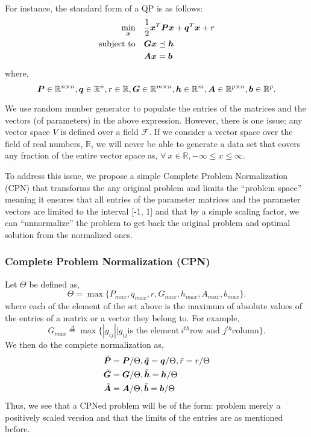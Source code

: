 \documentclass{article} %
\begin{document}
    For instance, the standard form of a QP is as follows:
    \begin{subequations}
    \begin{align}
        \min_{{\bm{x}}} \quad &\frac{1}{2}{\bm{x}}^T {\bm{P}} {\bm{x}} + {\bm{q}}^T {\bm{x}} + r \\
        \text{subject to} \quad &{\bm{G}} {\bm{x}} \preceq {\bm{h}} \\
        \quad &{\bm{A}} {\bm{x}} = {\bm{b}}  
    \end{align}
    \end{subequations}
    where, \[{\bm{P}} \in \mathbb{R}^{n \times n}, {\bm{q}} \in \mathbb{R}^{n}, r \in \mathbb{R}, {\bm{G}} \in \mathbb{R}^{m \times n}, {\bm{h}} \in \mathbb{R}^{m}, {\bm{A}} \in \mathbb{R}^{p \times n}, {\bm{b}} \in \mathbb{R}^{p}.\]

    We use random number generator to populate the entries of the matrices and the vectors (of parameters) in the above expression. However, there is one issue; any vector space $V$ is defined over a field $\mathcal{F}$. If we consider a vector space over the field of real numbers, $\mathbb{R}$, we will never be able to generate a data set that covers any fraction of the entire vector space as, $\forall\ x \in \mathbb{R}, -\infty \leq x \leq \infty$. 

    To address this issue, we propose a simple Complete Problem Normalization (CPN) that transforms the any original problem and limits the ``problem space'' meaning it ensures that all entries of the parameter matrices and the parameter vectors are limited to the interval [-1, 1] and that by a simple scaling factor, we can ``unnormalize'' the problem to get back the original problem and optimal solution from the normalized ones.

    \subsubsection{Complete Problem Normalization (CPN)}
    Let $\Theta$ be defined as,
    \[
    \Theta = \max\{P_{max}, q_{max}, r, G_{max}, h_{max}, A_{max}, b_{max}\}.
    \]
    where each of the element of the set above is the maximum of absolute values of the entries of a matrix or a vector they belong to. For example,
    \[
    G_{max} \overset{\Delta}{=} \max\{|g_{ij}|| g_{ij} \text{is the element}\ i^{th} \text{row and } j^{th} \text{column}\}.
    \]  
    We then do the complete normalization as,
    \begin{subequations}
        \begin{align}
            \tilde{{\bm{P}}} &= {\bm{P}} / \Theta, \tilde{{\bm{q}}} = {\bm{q}} / \Theta, \tilde{r} = r / \Theta \\
            \tilde{{\bm{G}}} &= {\bm{G}} / \Theta, \tilde{{\bm{h}}} = {\bm{h}} / \Theta\\ 
            \tilde{{\bm{A}}} &= {\bm{A}} / \Theta, \tilde{{\bm{b}}} = {\bm{b}} / \Theta
        \end{align}
    \end{subequations}
    Thus, we see that a CPNed problem will be of the form: problem merely a positively scaled version and that the limits of the entries are as mentioned before. 
   
\end{document}
